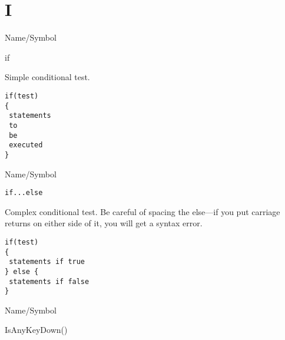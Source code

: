 \rl


\section{I}
\rl


\begin{desc}{Name/Symbol}
\item[Name/Symbol]	if 

\item[Description]	Simple conditional test.

\item[Usage]
\begin{verbatim}
if(test)
{
 statements
 to
 be 
 executed
}
\end{verbatim}

\item[Example]	

\item[See Also]	
\end{desc}

\rl




\begin{desc}{Name/Symbol}
\item[Name/Symbol]	\verb+if...else+            

\item[Description]	Complex conditional test.  Be careful of spacing 
		the else---if you put carriage returns on either side 
		of it, you will get a syntax error.

\item[Usage]
\begin{verbatim}
if(test)
{
 statements if true
} else {
 statements if false
}
\end{verbatim}

\item[Example]	

\item[See Also]	
\end{desc}

\rl


\begin{desc}{Name/Symbol}
\item[Name/Symbol]	IsAnyKeyDown()

\item[Description]	

\item[Usage]		

\item[Example]	

\item[See Also]	
\end{desc}

